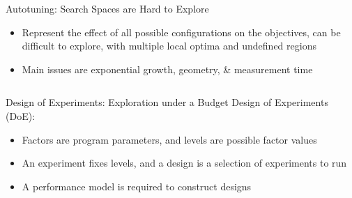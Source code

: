 \documentclass[11pt, compress, aspectratio=169, xcolor={table,usenames,dvipsnames}]{beamer}
\begin{document}
\begin{frame}
\begin{columns}
\begin{column}{0.89\columnwidth}
\begin{columns}
\begin{column}[t]{0.48\columnwidth}
\begin{block}{Autotuning: Search Spaces are Hard to Explore}
\begin{itemize}
\item Represent the \alert{effect} of all possible
\alert{configurations} on the \alert{objectives}, can be difficult to explore,
with multiple \alert{local optima} and \alert{undefined regions}
\item \alert{Main issues} are \alert{exponential growth}, \alert{geometry}, \& \alert{measurement time}
\end{itemize}
\end{block}
\end{column}
\end{columns}
\begin{columns}
\begin{column}[t]{0.48\columnwidth}
\begin{block}{Design of Experiments: Exploration under a Budget}
\alert{Design of Experiments} (\alert{DoE}):
\vspace{1em}
\begin{itemize}
\item \alert{Factors} are program \alert{parameters},
and \alert{levels} are possible factor \alert{values}
\item An \alert{experiment} fixes levels,
and a \alert{design} is a \alert{selection} of experiments to \alert{run}
\item A \alert{performance model} is required to \alert{construct designs}
\end{itemize}


\end{block}
\end{column}
\end{columns}
\end{column}
\end{columns}
\end{frame}
\end{document}

